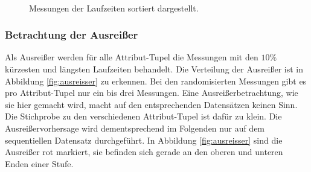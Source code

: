 \documentclass[
	twoside,
	12pt,
	a4paper,
	BCOR10mm,
	DIV14,
	listof=totoc,
	bibliography=totoc,
	headsepline
]{scrreprt}
\begin{document}
\begin{figure}
	\centering
	\hfill
	\\
	\hfill
	\caption{Messungen der Laufzeiten sortiert dargestellt.}
	\label{Laufzeiten_Sortiert}
\end{figure} 

\subsubsection{Betrachtung der Ausreißer}
Als Ausreißer werden für alle Attribut-Tupel die Messungen mit den $10\%$ kürzesten und längsten Laufzeiten behandelt. Die Verteilung der Ausreißer ist in Abbildung \ref{fig:ausreisser} zu erkennen.
Bei den randomisierten Messungen gibt es pro Attribut-Tupel nur ein bis drei Messungen. Eine Ausreißerbetrachtung, wie sie hier gemacht wird, macht auf den entsprechenden Datensätzen keinen Sinn. Die Stichprobe zu den verschiedenen Attribut-Tupel ist dafür zu klein.
Die Ausreißervorhersage wird dementsprechend im Folgenden nur auf dem sequentiellen Datensatz durchgeführt.
In Abbildung \ref{fig:ausreisser} sind die Ausreißer rot markiert, sie befinden sich gerade an den oberen und unteren Enden einer Stufe.
\end{document}
